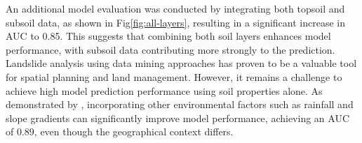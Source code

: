 An additional model evaluation was conducted by integrating both topsoil and subsoil data, as shown in Fig\ref{fig:all-layers}, resulting in a significant increase in AUC to 0.85. This suggests that combining both soil layers enhances model performance, with subsoil data contributing more strongly to the prediction. Landslide analysis using data mining approaches has proven to be a valuable tool for spatial planning and land management. However, it remains a challenge to achieve high model prediction performance using soil properties alone. As demonstrated by \cite{disc07}, incorporating other environmental factors such as rainfall and slope gradients can significantly improve model performance, achieving an AUC of 0.89, even though the geographical context differs.


